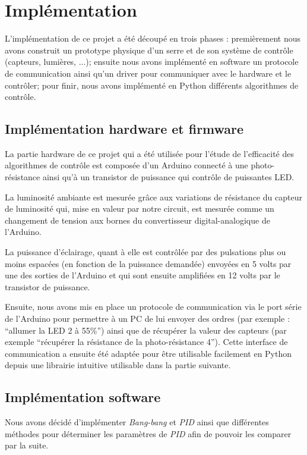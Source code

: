 \documentclass[a4paper,10pt]{report}
\begin{document}
\chapter{Implémentation}
\label{chap:impl}

L'implémentation de ce projet a été découpé en trois phases : premièrement nous avons construit un prototype physique d'un serre et de son système de contrôle (capteurs, lumières, ...); ensuite nous avons implémenté en software un protocole de communication ainsi qu'un driver pour communiquer avec le hardware et le contrôler; pour finir, nous avons implémenté en Python différents algorithmes de contrôle.

\section{Implémentation hardware et firmware}

La partie hardware de ce projet qui a été utilisée pour l'étude de l'efficacité des algorithmes de contrôle est composée d'un Arduino connecté à une photo-résistance ainsi qu'à un transistor de puissance qui contrôle de puissantes LED.

La luminosité ambiante est mesurée grâce aux variations de résistance du capteur de luminosité qui, mise en valeur par notre circuit, est mesurée comme un changement de tension aux bornes du convertisseur digital-analogique de l'Arduino.

La puissance d'éclairage, quant à elle est contrôlée par des pulsations plus ou moins espacées (en fonction de la puissance demandée) envoyées en 5 volts par une des sorties de l'Arduino et qui sont ensuite amplifiées en 12 volts par le transistor de puissance.

Ensuite, nous avons mis en place un protocole de communication via le port série de l'Arduino pour permettre à un PC de lui envoyer des ordres (par exemple : ``allumer la LED 2 à 55\%'') ainsi que de récupérer la valeur des capteurs (par exemple ``récupérer la résistance de la photo-résistance 4''). Cette interface de communication a ensuite été adaptée pour être utilisable facilement en Python depuis une librairie intuitive utilisable dans la partie suivante.


\section{Implémentation software}

Nous avons décidé d'implémenter \textit{Bang-bang} et \textit{PID} ainsi que différentes méthodes pour déterminer les paramètres de \textit{PID} afin de pouvoir les comparer par la suite.
\end{document}

